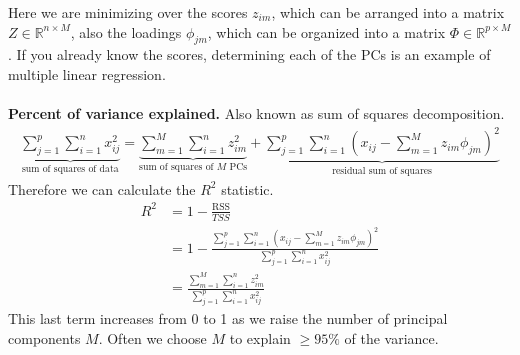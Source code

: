 \documentclass[12pt, letterpaper]{article}
\begin{document}
Here we are minimizing over the scores $z_{im}$, which can be arranged
into a matrix $Z \in \mathbb{R}^{n\times M}$, also the loadings $\phi_{jm}$,
which can be organized into a matrix $\Phi \in \mathbb{R}^{p\times M}$. 
If you already know the scores, determining each of the PCs is an example of 
multiple linear regression. \\ \\
\textbf{Percent of variance explained.} Also known as sum of squares decomposition.
\begin{align*}
    \underbrace{\sum_{j=1}^{p}\sum_{i=1}^{n}x_{ij}^2}_{\text{sum of squares of data}} = 
    \underbrace{\sum_{m=1}^{M}\sum_{i=1}^{n}z^2_{im}}_{\text{sum of squares of }M\text{ PCs}} +
    \underbrace{\sum_{j=1}^{p}\sum_{i=1}^{n}\left(x_{ij} - \sum_{m=1}^{M}z_{im}\phi_{jm}\right)^2}_{\text{residual sum of squares}}
\end{align*}
Therefore we can calculate the $R^2$ statistic.
\begin{align*}
    R^2 &= 1 - \frac{\text{RSS}}{TSS} \\
    &= 1 - \frac{\sum_{j=1}^{p}\sum_{i=1}^{n}\left(x_{ij} - \sum_{m=1}^{M}z_{im}\phi_{jm}\right)^2}{\sum_{j=1}^{p}\sum_{i=1}^{n}x_{ij}^2} \\
    &= \frac{\sum_{m=1}^{M}\sum_{i=1}^{n}z_{im}^2}{\sum_{j=1}^{p}\sum_{i=1}^{n}x_{ij}^2}
\end{align*}
This last term increases from 0 to 1 as we raise the number of principal components $M$.
Often we choose $M$ to explain $\ge 95\%$ of the variance.
\end{document}
